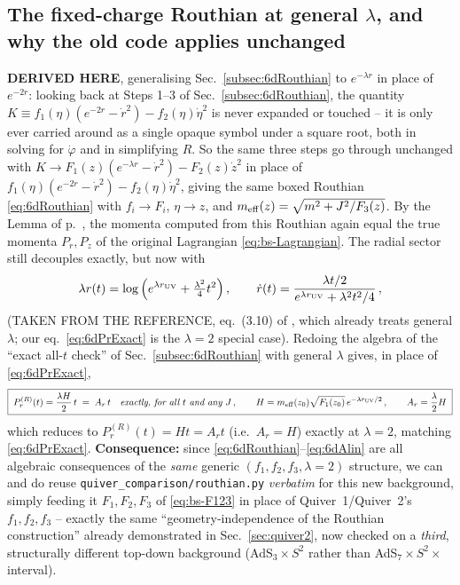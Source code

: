 \documentclass[11pt]{article}
\begin{document}
\subsection{The fixed-charge Routhian at general $\lambda$, and why the old code applies unchanged}
\label{subsec:bs-routhian}

\textbf{DERIVED HERE}, generalising Sec.~\ref{subsec:6dRouthian} to $e^{-\lambda r}$ in place of $e^{-2r}$: looking back at Steps 1--3 of Sec.~\ref{subsec:6dRouthian}, the quantity $K\equiv f_1(\eta)(e^{-2r}-\dot r^2)-f_2(\eta)\dot\eta^2$ is never expanded or touched -- it is only ever carried around as a single opaque symbol under a square root, both in solving for $\dot\varphi$ and in simplifying $R$. So the same three steps go through unchanged with $K\to F_1(z)(e^{-\lambda r}-\dot r^2)-F_2(z)\dot z^2$ in place of $f_1(\eta)(e^{-2r}-\dot r^2)-f_2(\eta)\dot\eta^2$, giving the same boxed Routhian \eqref{eq:6dRouthian} with $f_i\to F_i$, $\eta\to z$, and $m_{\rm eff}(z)=\sqrt{m^2+J^2/F_3(z)}$. By the Lemma of p.~\pageref{lemma:routh}, the momenta computed from this Routhian again equal the true momenta $P_r,P_z$ of the original Lagrangian \eqref{eq:bs-Lagrangian}. The radial sector still decouples exactly, but now with
\begin{equation}
\lambda r(t)=\log\Big(e^{\lambda r_{\rm UV}}+\tfrac{\lambda^2}4t^2\Big)\,,
\qquad
\dot r(t)=\frac{\lambda t/2}{e^{\lambda r_{\rm UV}}+\lambda^2t^2/4}\,,
\label{eq:bs-rt}
\end{equation}
(TAKEN FROM THE REFERENCE, eq.~(3.10) of \cite{Fatemiabhari:2025qcg}, which already treats general $\lambda$; our eq.~\eqref{eq:6dPrExact} is the $\lambda=2$ special case). Redoing the algebra of the ``exact all-$t$ check'' of Sec.~\ref{subsec:6dRouthian} with general $\lambda$ gives, in place of \eqref{eq:6dPrExact},
\begin{equation}
\boxed{\;
P_r^{(R)}(t) = \frac{\lambda H}2\,t\;=\;A_r\,t\quad\text{\emph{exactly, for all $t$ and any $J$}}\,,
\qquad
H=m_{\rm eff}(z_0)\sqrt{F_1(z_0)}\,e^{-\lambda r_{\rm UV}/2}\,,
\qquad
A_r=\frac\lambda2 H\;}
\label{eq:bs-PrExact}
\end{equation}
which reduces to $P_r^{(R)}(t)=Ht=A_rt$ (i.e.\ $A_r=H$) exactly at $\lambda=2$, matching \eqref{eq:6dPrExact}. \textbf{Consequence:} since \eqref{eq:6dRouthian}--\eqref{eq:6dAlin} are all algebraic consequences of the \emph{same} generic $(f_1,f_2,f_3,\lambda{=}2)$ structure, we can and do reuse \texttt{quiver\_comparison/routhian.py} \emph{verbatim} for this new background, simply feeding it $F_1,F_2,F_3$ of \eqref{eq:bs-F123} in place of Quiver~1/Quiver~2's $f_1,f_2,f_3$ -- exactly the same ``geometry-independence of the Routhian construction'' already demonstrated in Sec.~\ref{sec:quiver2}, now checked on a \emph{third}, structurally different top-down background (AdS$_3\times S^2$ rather than AdS$_7\times S^2\times$interval).
\end{document}
